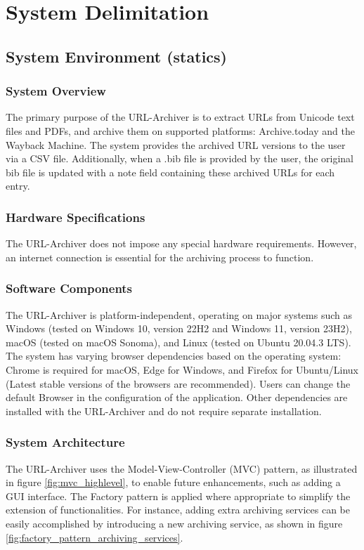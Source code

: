 \section{System Delimitation}

\subsection{System Environment (statics)}
\subsubsection{System Overview}
The primary purpose of the URL-Archiver is to extract URLs from Unicode text files and PDFs, and archive them on supported platforms: Archive.today and the Wayback Machine. The system provides the archived URL versions to the user via a CSV file. Additionally, when a .bib file is provided by the user, the original bib file is updated with a note field containing these archived URLs for each entry.

\subsubsection{Hardware Specifications}
The URL-Archiver does not impose any special hardware requirements. However, an internet connection is essential for the archiving process to function.

\subsubsection{Software Components}
The URL-Archiver is platform-independent, operating on major systems such as Windows (tested on Windows 10, version 22H2  and Windows 11, version 23H2), macOS (tested on macOS Sonoma), and Linux (tested on Ubuntu 20.04.3 LTS). The system has varying browser dependencies based on the operating system: Chrome is required for macOS, Edge for Windows, and Firefox for Ubuntu/Linux (Latest stable versions of the browsers are recommended). Users can change the default Browser in the configuration of the application. Other dependencies are installed with the URL-Archiver and do not require separate installation.

\subsubsection{System Architecture}
The URL-Archiver uses the Model-View-Controller (MVC) pattern, as illustrated in figure \ref{fig:mvc_highlevel}, to enable future enhancements, such as adding a GUI interface. The Factory pattern is applied where appropriate to simplify the extension of functionalities. For instance, adding extra archiving services can be easily accomplished by introducing a new archiving service, as shown in figure \ref{fig:factory_pattern_archiving_services}.

